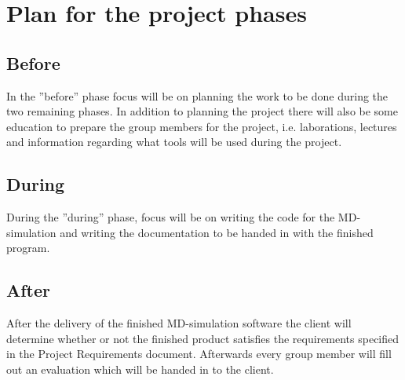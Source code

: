 \section{Plan for the project phases}

\subsection{Before}
In the ''before'' phase focus will be on planning the work to be done during
the two remaining phases. In addition to planning the project there will also
be some education to prepare the group members for the project, i.e.
laborations, lectures and information regarding what tools will be used during
the project.

\subsection{During}
During the ''during'' phase, focus will be on writing the code for the
MD-simulation and writing the documentation to be handed in with the finished
program.

\subsection{After}                     
After the delivery of the finished MD-simulation software the
client will determine whether or not the finished product satisfies the
requirements specified in the Project Requirements document. Afterwards
every group member will fill out an evaluation which will be handed in to the client.
